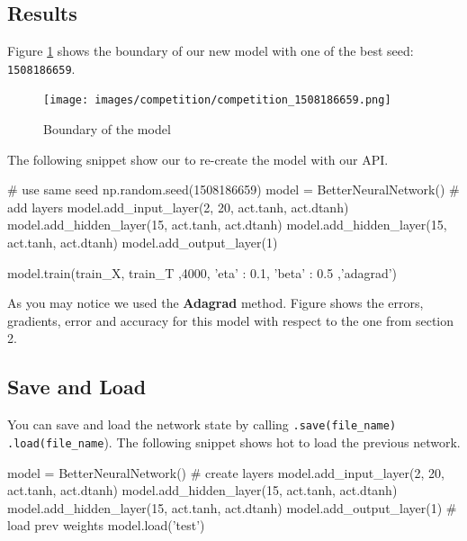 \documentclass[11pt]{article}
\begin{document}
\subsection{Results}
Figure \ref{fig: results_boundary} shows the boundary of our new model with one of the best seed: \texttt{1508186659}.
\begin{figure}[H]
\label{fig: results_boundary}
\centering
\texttt{[image: images/competition/competition\_1508186659.png]}	
\caption{Boundary of the model}
\end{figure}

The following snippet show our to re-create the model with our API.
\begin{python}
	# use same seed
	np.random.seed(1508186659)
    model = BetterNeuralNetwork()
    # add layers
    model.add_input_layer(2, 20, act.tanh, act.dtanh)
    model.add_hidden_layer(15, act.tanh, act.dtanh)
    model.add_hidden_layer(15, act.tanh, act.dtanh)
    model.add_output_layer(1)

    model.train(train_X, train_T ,4000, { 'eta' : 0.1, 'beta' : 0.5 },'adagrad')
\end{python}

As you may notice we used the \textbf{Adagrad} method. Figure shows the errors, gradients, error and accuracy for this model with respect to the one from section 2.

\begin{figure}
	
\end{figure}

\subsection{Save and Load}
You can save and load the network state by calling \texttt{.save(file\_name)} \texttt{.load(file\_name}). The following snippet shows hot to load the previous network.

\begin{python}
    model = BetterNeuralNetwork()
    # create layers
    model.add_input_layer(2, 20, act.tanh, act.dtanh)
    model.add_hidden_layer(15, act.tanh, act.dtanh)
    model.add_hidden_layer(15, act.tanh, act.dtanh)
    model.add_output_layer(1)
    # load prev weights
    model.load('test')
\end{python}

\newpage
\printbibliography
\end{document}
